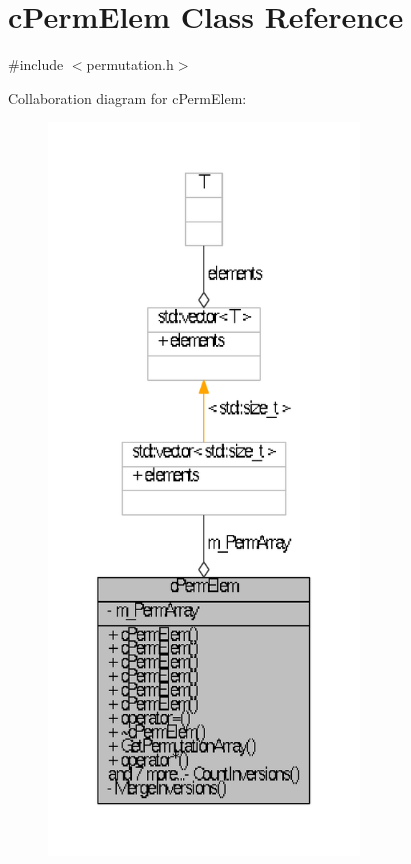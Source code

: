 \hypertarget{classcPermElem}{\section{c\-Perm\-Elem \-Class \-Reference}
\label{classcPermElem}
}


{\ttfamily \#include $<$permutation.\-h$>$}



\-Collaboration diagram for c\-Perm\-Elem\-:
\nopagebreak
\begin{figure}[H]
\begin{center}
\leavevmode
\includegraphics[height=550pt]{classcPermElem__coll__graph}
\end{center}
\end{figure}

